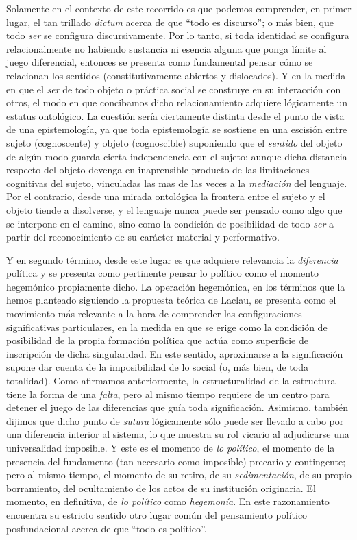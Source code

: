 Solamente en el contexto de este recorrido es que podemos comprender, en primer lugar, el tan trillado \emph{dictum} acerca de que ``todo es discurso''; o más bien, que todo \emph{ser} se configura discursivamente. Por lo tanto, si toda identidad se configura relacionalmente no habiendo sustancia ni esencia alguna que ponga límite al juego diferencial, entonces se presenta como fundamental pensar cómo se relacionan los sentidos (constitutivamente abiertos y dislocados). Y en la medida en que el \emph{ser} de todo objeto o práctica social se construye en su interacción con otros, el modo en que concibamos dicho relacionamiento adquiere lógicamente un estatus ontológico. La cuestión sería ciertamente distinta desde el punto de vista de una epistemología, ya que toda epistemología se sostiene en una escisión entre sujeto (cognoscente) y objeto (cognoscible) suponiendo que el \emph{sentido} del objeto de algún modo guarda cierta independencia con el sujeto; aunque dicha distancia respecto del objeto devenga en inaprensible producto de las limitaciones cognitivas del sujeto, vinculadas las mas de las veces a la \emph{mediación} del lenguaje. Por el contrario, desde una mirada ontológica la frontera entre el sujeto y el objeto tiende a disolverse, y el lenguaje nunca puede ser pensado como algo que se interpone en el camino, sino como la condición de posibilidad de todo \emph{ser} a partir del reconocimiento de su carácter material y performativo.

Y en segundo término, desde este lugar es que adquiere relevancia la \emph{diferencia} política y se presenta como pertinente pensar lo político como el momento hegemónico propiamente dicho. La operación hegemónica, en los términos que la hemos planteado siguiendo la propuesta teórica de Laclau, se presenta como el movimiento más relevante a la hora de comprender las configuraciones significativas particulares, en la medida en que se erige como la condición de posibilidad de la propia formación política que actúa como superficie de inscripción de dicha singularidad. En este sentido, aproximarse a la significación supone dar cuenta de la imposibilidad de lo social (o, más bien, de toda totalidad). Como afirmamos anteriormente, la estructuralidad de la estructura tiene la forma de una \emph{falta}, pero al mismo tiempo requiere de un centro para detener el juego de las diferencias que guía toda significación. Asimismo, también dijimos que dicho punto de \emph{sutura} lógicamente sólo puede ser llevado a cabo por una diferencia interior al sistema, lo que muestra su rol vicario al adjudicarse una universalidad imposible. Y este es el momento de \emph{lo político}, el momento de la presencia del fundamento (tan necesario como imposible) precario y contingente; pero al mismo tiempo, el momento de su retiro, de su \emph{sedimentación}, de su propio borramiento, del ocultamiento de los actos de su institución originaria. El momento, en definitiva, de \emph{lo político} como \emph{hegemonía}. En este razonamiento encuentra su estricto sentido otro lugar común del pensamiento político posfundacional acerca de que ``todo es político''.

